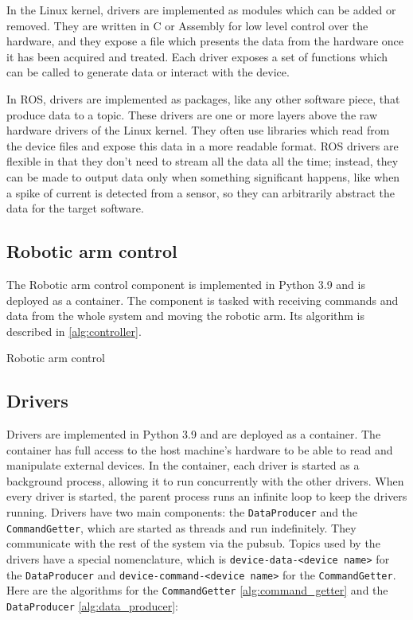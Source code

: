 In the Linux kernel, drivers are implemented as modules which can be added or removed. They are written in C or Assembly for low level control over the hardware, and they expose a file which presents the data from the hardware once it has been acquired and treated. Each driver exposes a set of functions which can be called to generate data or interact with the device.

In ROS, drivers are implemented as packages, like any other software piece, that produce data to a topic. These drivers are one or more layers above the raw hardware drivers of the Linux kernel. They often use libraries which read from the device files and expose this data in a more readable format. ROS drivers are flexible in that they don't need to stream all the data all the time; instead, they can be made to output data only when something significant happens, like when a spike of current is detected from a sensor, so they can arbitrarily abstract the data for the target software.


\subsection{Robotic arm control}

The Robotic arm control component is implemented in Python 3.9 and is deployed as a container. The component is tasked with receiving commands and data from the whole system and moving the robotic arm. Its algorithm is described in \ref{alg:controller}.

\begin{algorithm}
  \caption{Robotic arm control}
  \label{alg:controller}
\end{algorithm}


\subsection{Drivers}

Drivers are implemented in Python 3.9 and are deployed as a container. The container has full access to the host machine's hardware to be able to read and manipulate external devices. In the container, each driver is started as a background process, allowing it to run concurrently with the other drivers. When every driver is started, the parent process runs an infinite loop to keep the drivers running. Drivers have two main components: the \lstinline{DataProducer} and the \lstinline{CommandGetter}, which are started as threads and run indefinitely. They communicate with the rest of the system via the \gls{pubsub}. Topics used by the drivers have a special nomenclature, which is \lstinline{device-data-<device name>} for the \lstinline{DataProducer} and \lstinline{device-command-<device name>} for the \lstinline{CommandGetter}. Here are the algorithms for the \lstinline{CommandGetter} \ref{alg:command_getter} and the \lstinline{DataProducer} \ref{alg:data_producer}:

